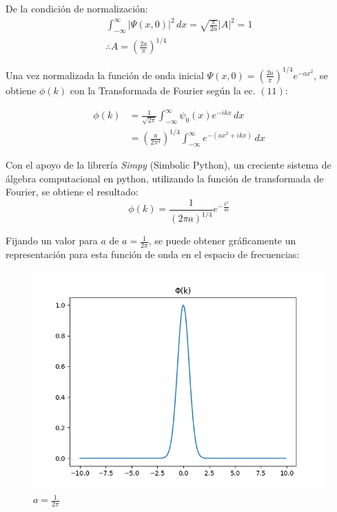 De la condición de normalización:
\begin{gather*}
    \int_{-\infty}^{\infty} \lvert\Psi(x,0)\rvert^2\,dx = \sqrt{\frac{\pi}{2a}} \lvert A \rvert^2 = 1 \\
    \therefore A = \left (\frac{2a}{\pi}\right )^{1/4}
\end{gather*}

Una vez normalizada la función de onda inicial $\Psi(x,0) = \left (\frac{2a}{\pi}\right )^{1/4} e^{-ax^2}$, se obtiene
$\phi(k)$ con la Transformada de Fourier según la ec. $(11)$:

\begin{align*}
    \phi(k) & = \frac{1}{\sqrt{2\pi}} \int_{-\infty}^{\infty} \psi_{0}(x)e^{-ikx}\,dx           \\
            & = \left(\frac{a}{2\pi^3}\right)^{1/4} \int_{-\infty}^{\infty} e^{-(ax^2+ikx)}\,dx
\end{align*}

Con el apoyo de la librería \emph{Simpy} (Simbolic Python), un creciente sistema de álgebra computacional en python,
utilizando la función de transformada de Fourier, se obtiene el resultado:
\begin{equation}
    \phi(k) = \frac{1}{(2\pi a)^{1/4}} e^{-\frac{k^2}{4a}}
\end{equation}

Fijando un valor para $a$ de $a=\frac{1}{2\pi}$, se puede obtener gráficamente un representación para esta función de
onda en el espacio de frecuencias:\\

\begin{figure}[H]
    \includegraphics[scale=0.45]{imagenes/graficas_particulalibre/phi(k).png}
    \caption{\emph{$a = \frac{1}{2\pi}$}}
\end{figure}


